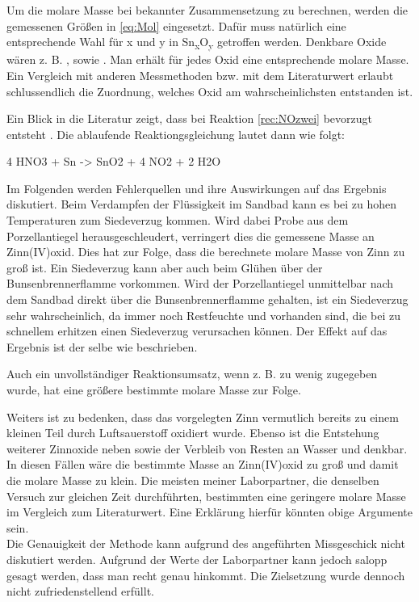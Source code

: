 \documentclass{article}
\begin{document}
    Um die molare Masse bei bekannter Zusammensetzung zu berechnen, werden die gemessenen Größen in \eqref{eq:Mol} eingesetzt. Dafür muss natürlich eine entsprechende Wahl für x und y in Sn\textsubscript{x}O\textsubscript{y} getroffen werden. Denkbare Oxide wären z. B. ,  sowie . Man erhält für jedes Oxid eine entsprechende molare Masse. Ein Vergleich mit anderen Messmethoden bzw. mit dem Literaturwert erlaubt schlussendlich die Zuordnung, welches Oxid am wahrscheinlichsten entstanden ist.
    
    Ein Blick in die Literatur zeigt, dass bei Reaktion \ref{rec:NOzwei} bevorzugt  entsteht \cite{ReactionProof}. Die ablaufende Reaktiongsgleichung lautet dann wie folgt:
    
    \begin{reactions}
        4 HNO3\aq{} + Sn\sld{} -> SnO2\sld{} + 4 NO2\gas{} + 2 H2O \label{rec:NO}
    \end{reactions}
    
    Im Folgenden werden Fehlerquellen und ihre Auswirkungen auf das Ergebnis diskutiert. Beim Verdampfen der Flüssigkeit im Sandbad kann es bei zu hohen Temperaturen zum Siedeverzug kommen. Wird dabei Probe aus dem Porzellantiegel herausgeschleudert, verringert dies die gemessene Masse an Zinn(IV)oxid. Dies hat zur Folge, dass die berechnete molare Masse von Zinn zu groß ist. Ein Siedeverzug kann aber auch beim Glühen über der Bunsenbrennerflamme vorkommen. Wird der Porzellantiegel unmittelbar nach dem Sandbad direkt über die Bunsenbrennerflamme gehalten, ist ein Siedeverzug sehr wahrscheinlich, da immer noch Restfeuchte und  vorhanden sind, die bei zu schnellem erhitzen einen Siedeverzug verursachen können. Der Effekt auf das Ergebnis ist der selbe wie beschrieben. 
    
    Auch ein unvollständiger Reaktionsumsatz, wenn z. B. zu wenig  zugegeben wurde, hat eine größere bestimmte molare Masse zur Folge. 
    
    Weiters ist zu bedenken, dass das vorgelegten Zinn vermutlich bereits zu einem kleinen Teil durch Luftsauerstoff oxidiert wurde. Ebenso ist die Entstehung weiterer Zinnoxide neben  sowie der Verbleib von Resten an Wasser und  denkbar. In diesen Fällen wäre die bestimmte Masse an Zinn(IV)oxid zu groß und damit die molare Masse zu klein. Die meisten meiner Laborpartner, die denselben Versuch zur gleichen Zeit durchführten, bestimmten eine geringere molare Masse im Vergleich zum Literaturwert. Eine Erklärung hierfür könnten obige Argumente sein. \\
    
    Die Genauigkeit der Methode kann aufgrund des angeführten Missgeschick nicht diskutiert werden. Aufgrund der Werte der Laborpartner kann jedoch salopp gesagt werden, dass man recht genau hinkommt. Die Zielsetzung wurde dennoch nicht zufriedenstellend erfüllt.
    
  \pagebreak
  
  \listofreactions
  \printbibliography[title=Literaturverzeichnis]
  \listoftables
  
\end{document}
